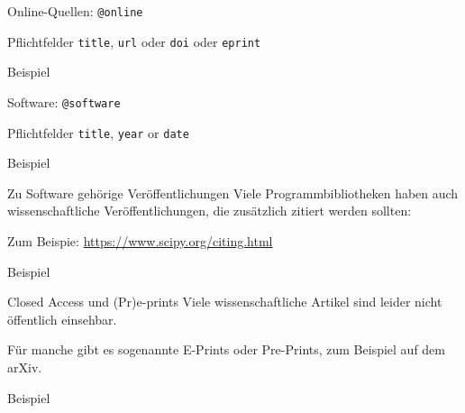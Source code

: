 \begin{frame}[fragile]{Online-Quellen: \lstinline+@online+}
  \begin{block}{Pflichtfelder}
    \texttt{title},
    \texttt{url} oder \texttt{doi} oder \texttt{eprint}
  \end{block}

  \begin{block}{Beispiel}
    
  \end{block}
\end{frame}

\begin{frame}[fragile]{Software: \lstinline+@software+}
  \begin{block}{Pflichtfelder}
    \texttt{title},
    \texttt{year} or \texttt{date}
  \end{block}

  \begin{block}{Beispiel}
    
  \end{block}
\end{frame}

\begin{frame}[fragile]{Zu Software gehörige Veröffentlichungen}
  Viele Programmbibliotheken haben auch wissenschaftliche Veröffentlichungen,
  die zusätzlich zitiert werden sollten:

  Zum Beispie: \url{https://www.scipy.org/citing.html}

  \begin{block}{Beispiel}
    \footnotesize
    
  \end{block}

\end{frame}

\begin{frame}[fragile]{Closed Access und (Pr)e-prints}
  Viele wissenschaftliche Artikel sind leider nicht öffentlich einsehbar.

  Für manche gibt es sogenannte E-Prints oder Pre-Prints, zum Beispiel auf dem arXiv.

  \begin{block}{Beispiel}
    \footnotesize
    
  \end{block}

\end{frame}

